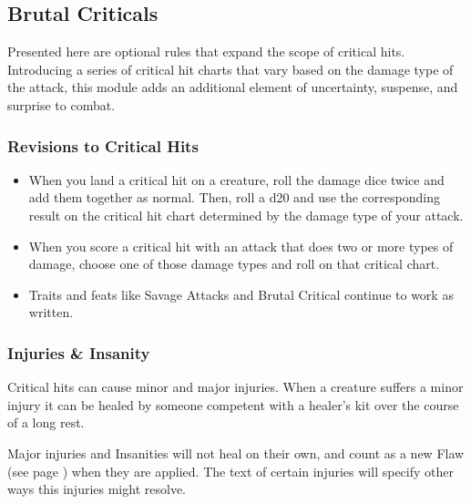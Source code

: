 \subsection*{Brutal Criticals} \label{ssec::brutalcriticals}

Presented here are optional rules that expand the scope of critical hits.
Introducing a series of critical hit charts that vary based on the damage type of the attack, this module adds an additional element of uncertainty, suspense, and surprise to combat.

\subsubsection{Revisions to Critical Hits}
    \begin{itemize}
        \item When you land a critical hit on a creature, roll the damage dice twice and add them together as normal.
        Then, roll a d20 and use the corresponding result on the critical hit chart determined by the damage type of your attack.
        \item When you score a critical hit with an attack that does two or more types of damage, choose one of those damage types and roll on that critical chart.
        \item Traits and feats like Savage Attacks and Brutal Critical continue to work as written.
    \end{itemize}

\subsubsection{Injuries \& Insanity}
    Critical hits can cause minor and major injuries.
    When a creature suffers a minor injury it can be healed by someone competent with a healer's kit over the course of a long rest.

    Major injuries and Insanities will not heal on their own, and count as a new Flaw (see page \pageref{ssec::flaws}) when they are applied.
    The text of certain injuries will specify other ways this injuries might resolve.

